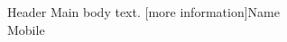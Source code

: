 \documentclass{beamer}
\begin{document}
  \begin{frame}{Header}
    Main body text.
      \stubs[15]{3cm}[more information]{Name \\ Mobile}
  \end{frame}
\end{document}
